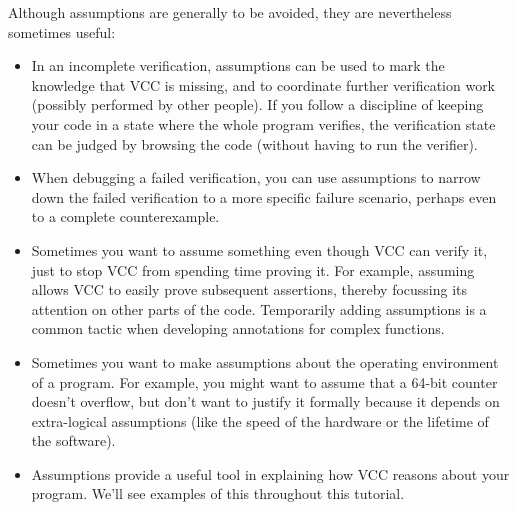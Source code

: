 Although assumptions are generally to be avoided, they are nevertheless
sometimes useful:
\begin{itemize}
\item In an incomplete verification, assumptions can be used to mark
  the knowledge that VCC is missing, and to coordinate further
  verification work (possibly performed by other people). If you
  follow a discipline of keeping your code in a state where the whole 
  program verifies, the verification state can be judged by browsing
  the code (without having to run the verifier).

\item When debugging a failed verification, you can use assumptions to
  narrow down the failed verification to a more specific failure
  scenario, perhaps even to a complete counterexample. 

\item Sometimes you want to assume something even though VCC can
  verify it, just to stop VCC from spending time proving it. For
  example, assuming \vcc{\false} allows VCC to 
  easily prove subsequent assertions, thereby focussing its
  attention on other parts of the code. Temporarily adding assumptions
  is a common tactic when developing annotations for complex functions.

\item Sometimes you want to make assumptions about the operating
  environment of a program. For example, you might want to assume that
  a 64-bit counter doesn't overflow, but don't want to justify it
  formally because it depends on extra-logical assumptions (like the
  speed of the hardware or the lifetime of the software). 

\item Assumptions provide a useful tool in explaining how VCC
  reasons about your program. We'll see examples of this throughout
  this tutorial.
\end{itemize}


